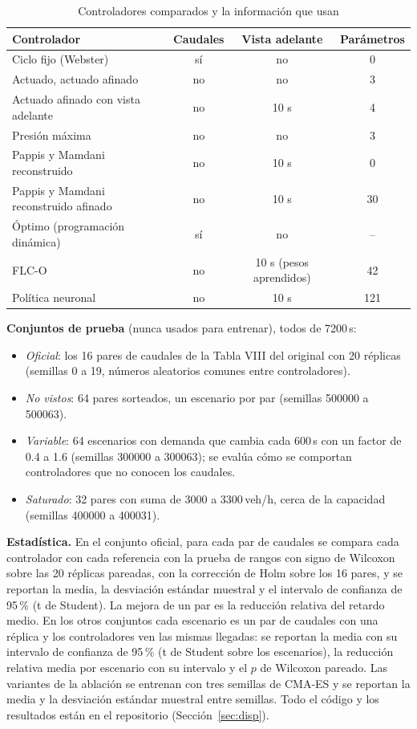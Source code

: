 \documentclass[journal]{IEEEtran}
\newcommand{\fuente}[1]{\par\vspace{3pt}\noindent{\scriptsize\textit{Fuente:} #1\par}}
\begin{document}
\begin{table}[t]
\centering
\caption{Controladores comparados y la información que usan}
\label{tab:controladores}
\scriptsize
\setlength{\tabcolsep}{2.5pt}
\begin{tabular}{@{}lccc@{}}
\toprule
Controlador & Caudales & Vista adelante & Parámetros \\
\midrule
Ciclo fijo (Webster) & sí & no & 0 \\
Actuado, actuado afinado & no & no & 3 \\
Actuado afinado con vista adelante & no & 10 s & 4 \\
Presión máxima & no & no & 3 \\
Pappis y Mamdani reconstruido & no & 10 s & 0 \\
Pappis y Mamdani reconstruido afinado & no & 10 s & 30 \\
Óptimo (programación dinámica) & sí & no & -- \\
FLC-O & no & 10 s (pesos aprendidos) & 42 \\
Política neuronal & no & 10 s & 121 \\
\bottomrule
\end{tabular}
\fuente{elaboración propia.}
\end{table}

\textbf{Conjuntos de prueba} (nunca usados para entrenar), todos de 7200\,s:
\begin{itemize}
\item \emph{Oficial}: los 16 pares de caudales de la Tabla VIII del original con 20 réplicas (semillas 0 a 19, números aleatorios comunes entre controladores).
\item \emph{No vistos}: 64 pares sorteados, un escenario por par (semillas 500000 a 500063).
\item \emph{Variable}: 64 escenarios con demanda que cambia cada 600\,s con un factor de 0.4 a 1.6 (semillas 300000 a 300063); se evalúa cómo se comportan controladores que no conocen los caudales.
\item \emph{Saturado}: 32 pares con suma de 3000 a 3300\,veh/h, cerca de la capacidad (semillas 400000 a 400031).
\end{itemize}

\textbf{Estadística.} En el conjunto oficial, para cada par de caudales se compara cada controlador con cada referencia con la prueba de rangos con signo de Wilcoxon sobre las 20 réplicas pareadas, con la corrección de Holm sobre los 16 pares, y se reportan la media, la desviación estándar muestral y el intervalo de confianza de 95\,\% (t de Student). La mejora de un par es la reducción relativa del retardo medio. En los otros conjuntos cada escenario es un par de caudales con una réplica y los controladores ven las mismas llegadas: se reportan la media con su intervalo de confianza de 95\,\% (t de Student sobre los escenarios), la reducción relativa media por escenario con su intervalo y el $p$ de Wilcoxon pareado. Las variantes de la ablación se entrenan con tres semillas de CMA-ES y se reportan la media y la desviación estándar muestral entre semillas. Todo el código y los resultados están en el repositorio (Sección~\ref{sec:disp}).
\end{document}
